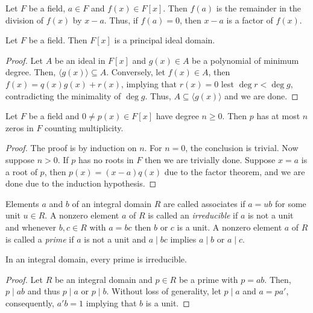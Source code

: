 \begin{corollary}
    Let $F$ be a field, $a\in F$ and $f(x)\in F[x]$. Then $f(a)$ is the remainder in the division of $f(x)$ by $x - a$. Thus, if $f(a) = 0$, then $x - a$ is a factor of $f(x)$.
\end{corollary}

\begin{theorem}
    Let $F$ be a field. Then $F[x]$ is a principal ideal domain.
\end{theorem}
\begin{proof}
    Let $A$ be an ideal in $F[x]$ and $g(x)\in A$ be a polynomial of minimum degree. Then, $\langle g(x)\rangle\subseteq A$. Conversely, let $f(x)\in A$, then $f(x) = q(x)g(x) + r(x)$, implying that $r(x) = 0$ lest $\deg r < \deg g$, contradicting the minimality of $\deg g$. Thus, $A\subseteq\langle g(x)\rangle$ and we are done.
\end{proof}

\begin{theorem}
    Let $F$ be a field and $0\ne p(x)\in F[x]$ have degree $n\ge 0$. Then $p$ has at most $n$ zeros in $F$ counting multiplicity.
\end{theorem}
\begin{proof}
    The proof is by induction on $n$. For $n = 0$, the conclusion is trivial. Now suppose $n > 0$. If $p$ has no roots in $F$ then we are trivially done. Suppose $x = a$ is a root of $p$, then $p(x) = (x - a)q(x)$ due to the factor theorem, and we are done due to the induction hypothesis.
\end{proof}

\begin{definition}
    Elements $a$ and $b$ of an integral domain $R$ are called associates if $a = ub$ for some unit $u\in R$. A nonzero element $a$ of $R$ is called an \textit{irreducible} if $a$ is not a unit and whenever $b,c\in R$ with $a = bc$ then $b$ or $c$ is a unit. A nonzero element $a$ of $R$ is called a \textit{prime} if $a$ is not a unit and $a\mid bc$ implies $a\mid b$ or $a\mid c$.
\end{definition}

\begin{theorem}
    In an integral domain, every prime is irreducible.
\end{theorem}
\begin{proof}
    Let $R$ be an integral domain and $p\in R$ be a prime with $p = ab$. Then, $p\mid ab$ and thus $p\mid a$ or $p\mid b$. Without loss of generality, let $p\mid a$ and $a = pa'$, consequently, $a'b = 1$ implying that $b$ is a unit.
\end{proof}

